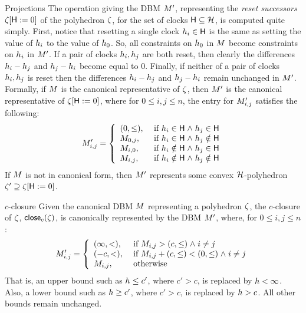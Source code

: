 {\begin{paragraph}{Projections}
The operation giving the DBM ${M}'$, representing the \emph{reset
successors} ${\zeta}[{\sf H}:=0]$ of the polyhedron ${\zeta}$, for
the set of clocks $\someclks \subseteq \clocks$, is computed quite
simply. First, notice that resetting a single clock $h_i \in
{\sf H}$ is the same as setting the value of $h_i$ to the value
of $h_0$. So, all constraints on $h_0$ in ${M}$ become
constraints on $h_i$ in ${M}'$. If a pair of clocks $h_i,
h_j$ are both reset, then clearly the differences $h_i -
h_j$ and $h_j - h_i$ become equal to $0$. Finally, if
neither of a pair of clocks $h_i, h_j$ is reset then the
differences $h_i - h_j$ and $h_j - h_i$ remain
unchanged in ${M}'$. Formally, if ${M}$ is the canonical representative
of ${\zeta}$, then ${M}'$ is the canonical representative of
${\zeta}[{\sf H}:=0]$, where for $0 \leq i,j \leq n$, the entry for
${M}'_{i,j}$ satisfies the following:
\[ {M}'_{i,j} = \left\{
      \begin{array}{ll}
         (0,\leq), & \text{ if } h_i \in {\sf H} \mathrel{\wedge} h_j \in {\sf H} \\ 
         {M}_{0,j}, & \text{ if } h_i \in {\sf H} \mathrel{\wedge} h_j \notin {\sf H} \\
         {M}_{i,0}, & \text{ if } h_i \notin {\sf H} \mathrel{\wedge} h_j \in {\sf H} \\
         {M}_{i,j}, & \text{ if } h_i \notin {\sf H} \mathrel{\wedge} h_j \notin {\sf H} 
      \end{array} \right.
\]
If ${M}$ is not in canonical form, then ${M}'$ represents some
convex $\clocks$-polyhedron ${\zeta}' \supseteq {\zeta}[{\sf H}:=0]$.
\end{paragraph}

\begin{paragraph}{$c$-closure}
Given the canonical DBM ${M}$ representing a polyhedron ${\zeta}$, the
$c$-closure of ${\zeta}$, ${\mathop{{\sf close}_{c}}({\zeta})}$, is canonically
represented by the DBM ${M}'$, where, for $0 \leq i,j \leq n$:
\[
{M}'_{i,j} = \left\{
  \begin{array}{ll}
     (\infty,<), & \text{ if } {M}_{i,j} > (c,\leq) \mathrel{\wedge} i \neq j \\
     (-c,<),        & \text{ if } {M}_{i,j} + (c,\leq) < (0,\leq) \mathrel{\wedge} i \neq j  \\
     {M}_{i,j},      & \text{ otherwise }
  \end{array} \right.
\]
That is, an upper bound such as $h \leq c'$, where $c' > c$,
is replaced by $h < \infty$. Also, a lower bound such as 
$h \geq c'$, where $c' > c$, is replaced by $h > c$. All other
bounds remain unchanged.
\end{paragraph}

}
